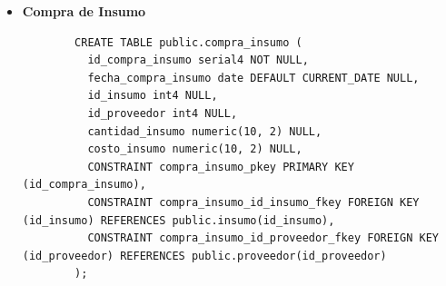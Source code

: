\begin{itemize}
    \begin{listing}[H]
        \centering
        \begin{verbatim}
        CREATE TABLE public.insumo (
          id_insumo serial4 NOT NULL,
          nombre_insumo varchar(100) NOT NULL,
          stock_actual numeric(10, 2) NULL,
          unidad_medida varchar(10) NULL,
          id_producto int4 NULL,
          CONSTRAINT insumo_pkey PRIMARY KEY (id_insumo),
          CONSTRAINT fk_insumo_producto FOREIGN KEY (id_producto) REFERENCES public.producto(id_producto)
        );
        \end{verbatim}
        \caption{Fragmento de código SQL para la creación de la tabla \texttt{insumo}.}
        \label{lst:insumo}
    \end{listing}

    \item \textbf{Compra de Insumo}
    \begin{listing}[H]
        \centering
        \begin{verbatim}
        CREATE TABLE public.compra_insumo (
          id_compra_insumo serial4 NOT NULL,
          fecha_compra_insumo date DEFAULT CURRENT_DATE NULL,
          id_insumo int4 NULL,
          id_proveedor int4 NULL,
          cantidad_insumo numeric(10, 2) NULL,
          costo_insumo numeric(10, 2) NULL,
          CONSTRAINT compra_insumo_pkey PRIMARY KEY (id_compra_insumo),
          CONSTRAINT compra_insumo_id_insumo_fkey FOREIGN KEY (id_insumo) REFERENCES public.insumo(id_insumo),
          CONSTRAINT compra_insumo_id_proveedor_fkey FOREIGN KEY (id_proveedor) REFERENCES public.proveedor(id_proveedor)
        );
        \end{verbatim}
        \caption{Fragmento de código SQL para la creación de la tabla \texttt{compra\_insumo}.}
        \label{lst:compra_insumo}
    \end{listing}
    \newpage
\end{itemize}

